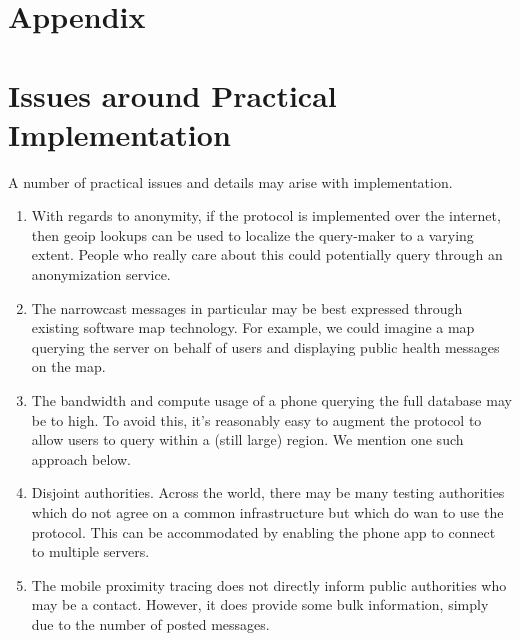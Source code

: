 \documentclass{article}
\begin{document}




\newpage
\appendix

\section*{Appendix}








\section{Issues around Practical Implementation}

A number of practical issues and details may arise with implementation.
\begin{enumerate}
    \item With regards to anonymity, if the protocol is implemented over the internet, then geoip lookups can be used to localize the query-maker to a varying extent.  People who really care about this could potentially query through an anonymization service.
    \item The narrowcast messages in particular may be best expressed through existing software map technology.   For example, we could imagine a map querying the server on behalf of users and displaying public health messages on the map.  
    \item The bandwidth and compute usage of a phone querying the full database may be to high.  To avoid this, it's reasonably easy to augment the protocol to allow users to query within a (still large) region.  We mention one such approach below.  
    \item Disjoint authorities.  Across the world, there may be many testing authorities which do not agree on a common infrastructure but which do wan to use the protocol.  This can be accommodated by enabling the phone app to connect to multiple servers. 
    \item The mobile proximity tracing does not directly inform public authorities who may be a contact.  However, it does provide some bulk information, simply due to the number of posted messages. 
\end{enumerate}
\end{document}
